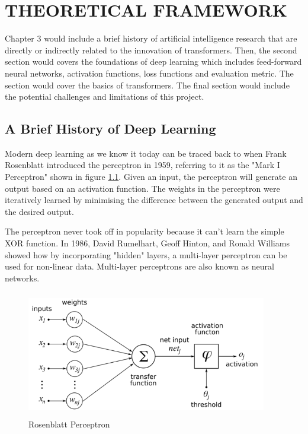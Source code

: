 \chapter{THEORETICAL FRAMEWORK}
\label{chap: 3}

Chapter 3 would include a  brief history of artificial intelligence research that are directly or indirectly related to the innovation of transformers. Then, the second section would covers the foundations of deep learning which includes feed-forward neural networks, activation functions, loss functions and evaluation metric. The  section would cover the basics of transformers. The final section would include the potential challenges and limitations of this project.

\section{A Brief History of Deep Learning}

Modern deep learning as we know it today can be traced back to when Frank Rosenblatt introduced the perceptron in 1959, referring to it as the "Mark I Perceptron" shown in figure \ref{fig:perceptron}. Given an input, the perceptron will generate an output based on an activation function. The weights in the perceptron were iteratively learned by minimising the difference between the generated output and the desired output.

The perceptron never took off in popularity because it can't  learn the simple XOR function. In 1986, David Rumelhart, Geoff Hinton, and Ronald Williams showed how by incorporating "hidden" layers, a multi-layer perceptron can be used for non-linear data. Multi-layer perceptrons are also known as neural networks.

\begin{figure}[ht]
\includegraphics[width=10.5cm, height=5.5cm]{images/Rosenblattperceptron.png}
\centering
\caption{Rosenblatt Perceptron \protect\cite{markovbook}}
\label{fig:perceptron}
\end{figure}

